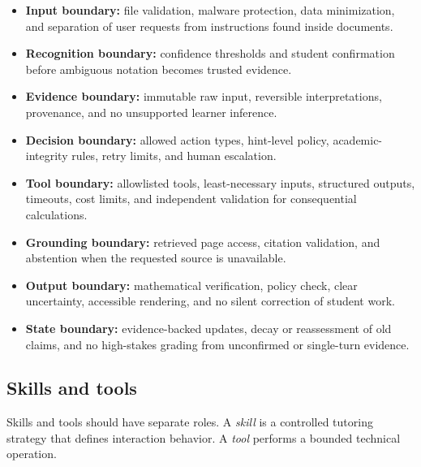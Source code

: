 \documentclass[11pt]{article}
\begin{document}
\begin{itemize}
    \item \textbf{Input boundary:} file validation, malware protection, data minimization, and separation of user requests from instructions found inside documents.
    \item \textbf{Recognition boundary:} confidence thresholds and student confirmation before ambiguous notation becomes trusted evidence.
    \item \textbf{Evidence boundary:} immutable raw input, reversible interpretations, provenance, and no unsupported learner inference.
    \item \textbf{Decision boundary:} allowed action types, hint-level policy, academic-integrity rules, retry limits, and human escalation.
    \item \textbf{Tool boundary:} allowlisted tools, least-necessary inputs, structured outputs, timeouts, cost limits, and independent validation for consequential calculations.
    \item \textbf{Grounding boundary:} retrieved page access, citation validation, and abstention when the requested source is unavailable.
    \item \textbf{Output boundary:} mathematical verification, policy check, clear uncertainty, accessible rendering, and no silent correction of student work.
    \item \textbf{State boundary:} evidence-backed updates, decay or reassessment of old claims, and no high-stakes grading from unconfirmed or single-turn evidence.
\end{itemize}

\subsection{Skills and tools}

Skills and tools should have separate roles. A \emph{skill} is a controlled tutoring strategy that defines interaction behavior. A \emph{tool} performs a bounded technical operation.
\end{document}
